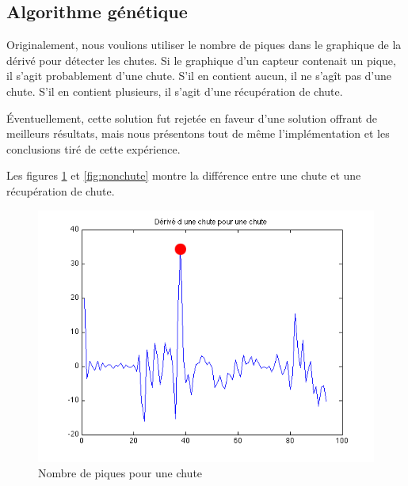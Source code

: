 \documentclass[12pt,letterpaper]{article}
\begin{document}
\subsection{Algorithme génétique}

Originalement, nous voulions utiliser le nombre de piques dans le graphique de la dérivé pour détecter les chutes.
Si le graphique d'un capteur contenait un pique, il s'agit probablement d'une chute. S'il en contient aucun, il
ne s'agît pas d'une chute. S’il en contient plusieurs, il s'agit d'une récupération de chute.

Éventuellement, cette solution fut rejetée en faveur d'une solution offrant de meilleurs résultats, mais nous
présentons tout de même l'implémentation et les conclusions tiré de cette expérience.

Les figures \ref{fig:chute} et \ref{fig:nonchute} montre la différence entre une chute et une récupération de chute.

\begin{figure}[htp]
\centering
\includegraphics[scale=0.5]{images/piques_chute.png}
\caption{Nombre de piques pour une chute}
\label{fig:chute}
\end{figure}
\end{document}

